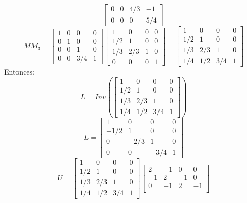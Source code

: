 \begin{itemize}
\[\begin{bmatrix}
    		0 & 0 & 4/3 & -1 \\
    		0 & 0 & 0 & 5/4  
  			\end{bmatrix}
  			\]	
  			\[ MM_{3} = 
  			\begin{bmatrix}
   			 1 & 0 & 0 & 0 \\ 
    		 0 & 1 & 0 & 0 \\
    		 0 & 0 & 1 & 0 \\
    		 0 & 0 & 3/4 & 1  
  			\end{bmatrix}
  			\begin{bmatrix}
   			 1 & 0 & 0 & 0 \\ 
    		 1/2 & 1 & 0 & 0 \\
    		 1/3 & 2/3 & 1 & 0 \\
    		 0 & 0 & 0 & 1  
  			\end{bmatrix}
  			= 
  			\begin{bmatrix}
   			 1 & 0 & 0 & 0 \\ 
    		 1/2 & 1 & 0 & 0 \\
    		 1/3 & 2/3 & 1 & 0 \\
    		 1/4 & 1/2 & 3/4 & 1  
  			\end{bmatrix}
  			\]
  			Entonces:
			\[ L =   			
  			Inv(\begin{bmatrix}
   			 1 & 0 & 0 & 0 \\ 
    		 1/2 & 1 & 0 & 0 \\
    		 1/3 & 2/3 & 1 & 0 \\
    		 1/4 & 1/2 & 3/4 & 1  
  			\end{bmatrix})
  			\]
			\[ L =   			
  			\begin{bmatrix}
   			 1 & 0 & 0 & 0 \\ 
    		 -1/2 & 1 & 0 & 0 \\
    		 0 & -2/3 & 1 & 0 \\
    		 0 & 0 & -3/4 & 1  
  			\end{bmatrix}
  			\] 			
  			\[ U =   			
  			\begin{bmatrix}
   			 1 & 0 & 0 & 0 \\ 
    		 1/2 & 1 & 0 & 0 \\
    		 1/3 & 2/3 & 1 & 0 \\
    		 1/4 & 1/2 & 3/4 & 1  
  			\end{bmatrix}
  			\begin{bmatrix}
    		2 & -1 & 0 & 0 \\
    		-1 & 2 & -1 & 0 \\
    		0 & -1 & 2 & -1 \\

\end{bmatrix}\]
\end{itemize}
